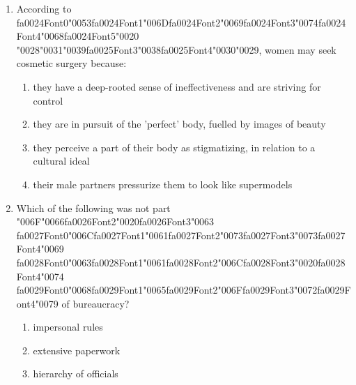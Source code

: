 \documentclass[12pt]{article}
\begin{document}
\begin{enumerate}[label=\arabic*.]
\begin{enumerate}[label=(\alph*)]
    \item the product they were making
    \item the production process
    \item each other and humanity in general
    \item all of the above
\end{enumerate}
\item According to {\csname fa0024Font0\endcsname\char"0053}{\csname fa0024Font1\endcsname\char"006D}{\csname fa0024Font2\endcsname\char"0069}{\csname fa0024Font3\endcsname\char"0074}{\csname fa0024Font4\endcsname\char"0068}{\csname fa0024Font5\endcsname\char"0020} {\char"0028}{\char"0031}{\char"0039}{\csname fa0025Font3\endcsname\char"0038}{\csname fa0025Font4\endcsname\char"0030}{\char"0029}, women may seek cosmetic surgery because:
\begin{enumerate}[label=(\alph*)]
    \item they have a deep-rooted sense of ineffectiveness and are striving for control
    \item they are in pursuit of the 'perfect' body, fuelled by images of beauty
    \item they perceive a part of their body as stigmatizing, in relation to a cultural ideal
    \item their male partners pressurize them to look like supermodels
\end{enumerate}
\item Which of the following was not part {\char"006F}{\char"0066}{\csname fa0026Font2\endcsname\char"0020}{\csname fa0026Font3\endcsname\char"0063} {\csname fa0027Font0\endcsname\char"006C}{\csname fa0027Font1\endcsname\char"0061}{\csname fa0027Font2\endcsname\char"0073}{\csname fa0027Font3\endcsname\char"0073}{\csname fa0027Font4\endcsname\char"0069} {\csname fa0028Font0\endcsname\char"0063}{\csname fa0028Font1\endcsname\char"0061}{\csname fa0028Font2\endcsname\char"006C}{\csname fa0028Font3\endcsname\char"0020}{\csname fa0028Font4\endcsname\char"0074} {\csname fa0029Font0\endcsname\char"0068}{\csname fa0029Font1\endcsname\char"0065}{\csname fa0029Font2\endcsname\char"006F}{\csname fa0029Font3\endcsname\char"0072}{\csname fa0029Font4\endcsname\char"0079} of bureaucracy?
\begin{enumerate}[label=(\alph*)]
    \item impersonal rules
    \item extensive paperwork
    \item hierarchy of officials

\end{enumerate}
\end{enumerate}
\end{document}
